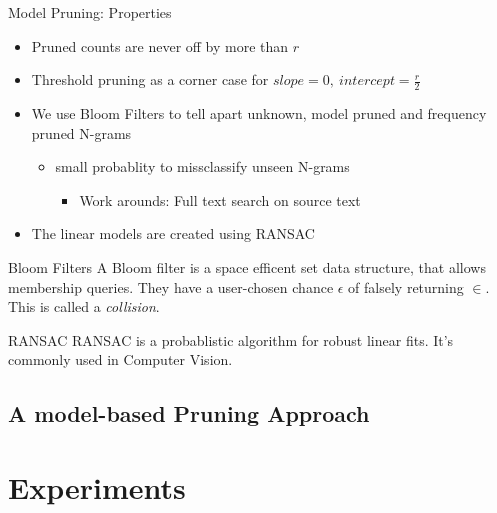 \documentclass[16:9,en,navbarinfooter]{sdqbeamer}
\begin{document}
\begin{frame}{Model Pruning: Properties}
    \vspace{1cm}
    \begin{itemize}
            \item Pruned counts are never off by more than $r$
            \item Threshold pruning as a corner case for $slope=0,\ intercept = \frac r2$
            \item We use Bloom Filters to tell apart unknown, model
                pruned and frequency pruned N-grams
                \begin{itemize}
                    \item small probablity to missclassify unseen 
                        N-grams
                        \begin{itemize}
                            \item Work arounds: Full text search on 
                                source text
                        \end{itemize}
                \end{itemize}
            \item The linear models are created using RANSAC
    \end{itemize}
    \begin{block}{Bloom Filters}
    A Bloom filter is a space efficent set data structure, that allows membership queries.
    They have a user-chosen chance $\epsilon$ of falsely returning $\in$. This is called a \emph{collision}.
    \end{block}
    \begin{block}{RANSAC}
    RANSAC is a probablistic algorithm for robust linear fits. It's commonly used in Computer Vision.
    \end{block}
\end{frame}
\subsection{A model-based Pruning Approach}
\section{Experiments}
\end{document}
